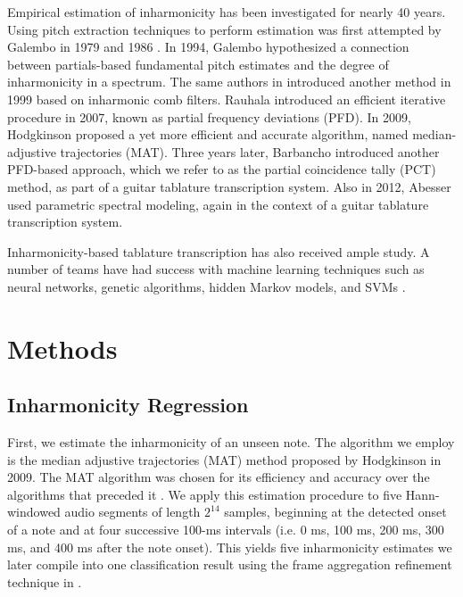 \documentclass[convention,peer-reviewed]{aesconf}
\begin{document}
Empirical estimation of inharmonicity has been investigated for nearly 40 years. Using pitch extraction techniques to perform estimation was first attempted by Galembo in 1979 and 1986 \citep{galembo1979,galembo1987}. In 1994, Galembo \citep{galembo1994} hypothesized a connection between partials-based fundamental pitch estimates and the degree of inharmonicity in a spectrum. The same authors in \citep{galembo1999} introduced another method in 1999 based on inharmonic comb filters. Rauhala \citep{rauhala2007} introduced an efficient iterative procedure in 2007, known as partial frequency deviations (PFD). In 2009, Hodgkinson \citep{hodgkinson2009} proposed a yet more efficient and accurate algorithm, named median-adjustive trajectories (MAT). Three years later, Barbancho \citep{barbanchoi2012} introduced another PFD-based approach, which we refer to as the partial coincidence tally (PCT) method, as part of a guitar tablature transcription system. Also in 2012, Abesser \citep{abesser2012} used parametric spectral modeling, again in the context of a guitar tablature transcription system.

Inharmonicity-based tablature transcription has also received ample study. A number of teams have had success with machine learning techniques such as neural networks, genetic algorithms, hidden Markov models, and SVMs  \citep{gagnon2003,tuohy2006,barbancho2009,barbanchoa2012,abesser2012,kehling2014,dittmar2013,abesser2012}.

\section{Methods}

\subsection{Inharmonicity Regression}
\label{sub:inharmonicity-regression}
First, we estimate the inharmonicity of an unseen note. The algorithm we employ is the median adjustive trajectories (MAT) method \citep{hodgkinson2009} proposed by Hodgkinson in 2009. The MAT algorithm was chosen for its efficiency and accuracy over the algorithms that preceded it \citep{hodgkinson2009}. We apply this estimation procedure to five Hann-windowed audio segments of length $2^{14}$ samples, beginning at the detected onset of a note and at four successive 100-ms intervals (i.e. 0 ms, 100 ms, 200 ms, 300 ms, and 400 ms after the note onset). This yields five inharmonicity estimates we later compile into one classification result using the frame aggregation refinement technique in \citep{abesser2012}.
\end{document}
